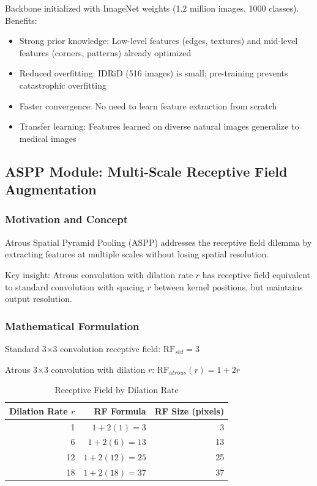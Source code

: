 \documentclass[12pt,a4paper]{article}
\begin{document}
Backbone initialized with ImageNet weights (1.2 million images, 1000 classes). Benefits:

\begin{itemize}
    \item Strong prior knowledge: Low-level features (edges, textures) and mid-level features (corners, patterns) already optimized
    \item Reduced overfitting: IDRiD (516 images) is small; pre-training prevents catastrophic overfitting
    \item Faster convergence: No need to learn feature extraction from scratch
    \item Transfer learning: Features learned on diverse natural images generalize to medical images
\end{itemize}

\subsection{ASPP Module: Multi-Scale Receptive Field Augmentation}

\subsubsection{Motivation and Concept}

Atrous Spatial Pyramid Pooling (ASPP) addresses the receptive field dilemma by extracting features at multiple scales without losing spatial resolution.

Key insight: Atrous convolution with dilation rate $r$ has receptive field equivalent to standard convolution with spacing $r$ between kernel positions, but maintains output resolution.

\subsubsection{Mathematical Formulation}

Standard 3×3 convolution receptive field: $\text{RF}_{std} = 3$

Atrous 3×3 convolution with dilation $r$: $\text{RF}_{atrous}(r) = 1 + 2r$

\begin{table}[H]
\centering
\small
\caption{Receptive Field by Dilation Rate}
\begin{tabular}{|r|r|r|}
\hline
\textbf{Dilation Rate $r$} & \textbf{RF Formula} & \textbf{RF Size (pixels)} \\
\hline
1 & $1 + 2(1) = 3$ & 3 \\
6 & $1 + 2(6) = 13$ & 13 \\
12 & $1 + 2(12) = 25$ & 25 \\
18 & $1 + 2(18) = 37$ & 37 \\
\hline
\end{tabular}
\end{table}
\end{document}

